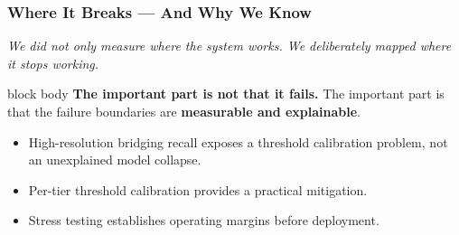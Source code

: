 \documentclass[aspectratio=169,11pt]{beamer}
\newcommand{\emphred}[1]{\textcolor{secondary}{#1}}
\newcommand{\emphhighlight}[1]{\textcolor{primary}{\textbf{#1}}}
\begin{document}
\begin{frame}\frametitle{\emphred{Where It Breaks --- And Why We Know}}

\begin{center}
\footnotesize\itshape
We did not only measure where the system works.
We deliberately mapped where it stops working.
\end{center}

\vspace{0.2cm}


\vspace{0.3cm}

\begin{beamercolorbox}[
    wd=0.9\paperwidth,
    rounded=true,
    sep=0.45em
  ]{block body}
\footnotesize
\textbf{The important part is not that it fails.}
The important part is that the failure boundaries are
\emphhighlight{measurable and explainable}.
\end{beamercolorbox}

\vspace{0.2cm}

\begin{itemize}
    \item High-resolution bridging recall exposes a
    \emphred{threshold calibration problem}, not an unexplained model collapse.
    \item Per-tier threshold calibration provides a practical mitigation.
    \item Stress testing establishes operating margins before deployment.
\end{itemize}

\end{frame}
\end{document}
